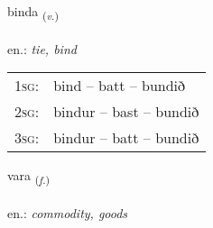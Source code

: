 \documentclass[frontgrid, backgrid]{flacards}\usepackage[]{graphicx}\usepackage[]{xcolor}
\begin{document}
\renewcommand{\flhead}{\vskip5pt \fboxsep=0pt {\small\bfseries\footnotesize Sagnorð | Verb}}
\renewcommand{\fcfoot}{\vskip5pt \fboxsep=0pt \hspace{2pt}{\small\bfseries\footnotesize 1K}}

\renewcommand{\blhead}{\vskip5pt {\small\bfseries\footnotesize Sagnorð | Verb }}
\renewcommand{\bcfoot}{\vskip5pt \hspace{2pt}{\small\bfseries\footnotesize 1K}}


{binda \small{\textsubscript{(\textit{v.})}} \\[1ex] %
\textphonetic{[pɪnta]} \\
en.: \emph{tie, bind} \\  [2ex]
\renewcommand*{\arraystretch}{0.8}
\begin{tabular}{p{1cm}l}
\textsc{1sg}: & bind -- batt -- bundið \\ 
\textsc{2sg}: & bindur -- bast -- bundið \\ 
\textsc{3sg}: & bindur -- batt -- bundið \\ 
\end{tabular}
}

\renewcommand{\flhead}{\vskip5pt \fboxsep=0pt {\small\bfseries\footnotesize Nafnorð | Noun}}
\renewcommand{\fcfoot}{\vskip5pt \fboxsep=0pt \hspace{2pt}{\small\bfseries\footnotesize 1K}}

\renewcommand{\blhead}{\vskip5pt {\small\bfseries\footnotesize Nafnorð | Noun }}
\renewcommand{\bcfoot}{\vskip5pt \hspace{2pt}{\small\bfseries\footnotesize 1K}}


{vara \small{\textsubscript{(\textit{f.})}} \\[1ex] %
\textphonetic{[vaːra]} \\
en.: \emph{commodity, goods} \\  [2ex]
\renewcommand*{\arraystretch}{0.8}
}
\end{document}
